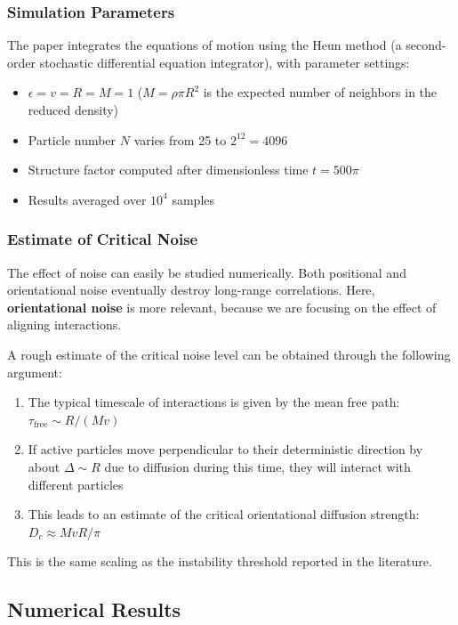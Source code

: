 \subsubsection{Simulation Parameters}

The paper integrates the equations of motion using the Heun method (a second-order stochastic differential equation integrator), with parameter settings:
\begin{itemize}
    \item $\epsilon = v = R = M = 1$ ($M = \rho\pi R^2$ is the expected number of neighbors in the reduced density)
    \item Particle number $N$ varies from 25 to $2^{12} = 4096$
    \item Structure factor computed after dimensionless time $t = 500\pi$
    \item Results averaged over $10^4$ samples
\end{itemize}

\subsubsection{Estimate of Critical Noise}

The effect of noise can easily be studied numerically. Both positional and orientational noise eventually destroy long-range correlations. Here, \textbf{orientational noise} is more relevant, because we are focusing on the effect of aligning interactions.

A rough estimate of the critical noise level can be obtained through the following argument:
\begin{enumerate}
    \item The typical timescale of interactions is given by the mean free path: $\tau_{\text{free}} \sim R/(Mv)$
    \item If active particles move perpendicular to their deterministic direction by about $\Delta \sim R$ due to diffusion during this time, they will interact with different particles
    \item This leads to an estimate of the critical orientational diffusion strength: $D_c \approx MvR/\pi$
\end{enumerate}

This is the same scaling as the instability threshold reported in the literature\cite{boltz2025}.

\subsection{Numerical Results}

